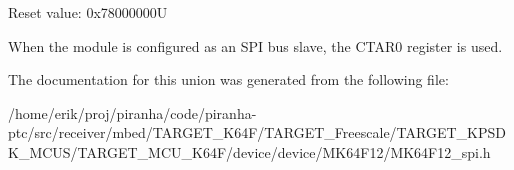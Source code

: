Reset value\+: 0x78000000U

When the module is configured as an S\+PI bus slave, the C\+T\+A\+R0 register is used. 

The documentation for this union was generated from the following file\+:\begin{DoxyCompactItemize}
\item 
/home/erik/proj/piranha/code/piranha-\/ptc/src/receiver/mbed/\+T\+A\+R\+G\+E\+T\+\_\+\+K64\+F/\+T\+A\+R\+G\+E\+T\+\_\+\+Freescale/\+T\+A\+R\+G\+E\+T\+\_\+\+K\+P\+S\+D\+K\+\_\+\+M\+C\+U\+S/\+T\+A\+R\+G\+E\+T\+\_\+\+M\+C\+U\+\_\+\+K64\+F/device/device/\+M\+K64\+F12/M\+K64\+F12\+\_\+spi.\+h\end{DoxyCompactItemize}

